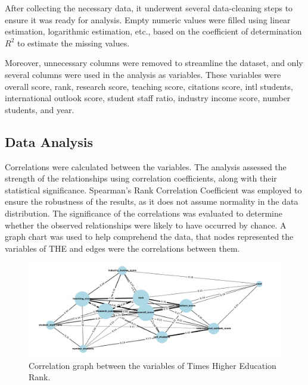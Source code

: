\documentclass[sigconf]{acmart}
\begin{document}
After collecting the necessary data, it underwent several data-cleaning steps to ensure it was ready for analysis. Empty numeric values were filled using linear estimation, logarithmic estimation, etc., based on the coefficient of determination $R^{2}$ to estimate the missing values. 

Moreover, unnecessary columns were removed to streamline the dataset, and only several columns were used in the analysis as variables. These variables were overall score, rank, research score, teaching score, citations score, intl students, international outlook score, student staff ratio, industry income score, number students, and year. 

\subsection{Data Analysis}

Correlations were calculated between the variables. The analysis assessed the strength of the relationships using correlation coefficients, along with their statistical significance. Spearman's Rank Correlation Coefficient \cite{spearman1904general} was employed to ensure the robustness of the results, as it does not assume normality in the data distribution. The significance of the correlations was evaluated to determine whether the observed relationships were likely to have occurred by chance. A graph chart was used to help comprehend the data, that nodes represented the variables of THE and edges were the correlations between them. 

\begin{figure}[t]
	\centering
	\includegraphics[width=\linewidth]{figures/correlation_graph.pdf}
	\caption{Correlation graph between the variables of Times Higher Education Rank.}
	\label{fig:graf_citation}
\end{figure}
\end{document}
